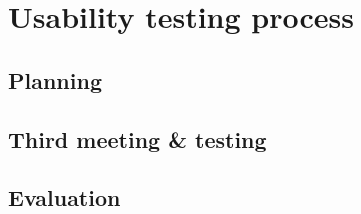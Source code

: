 \section{Usability testing process}

\subsection{Planning}

\subsection{Third meeting \& testing}

\subsection{Evaluation}